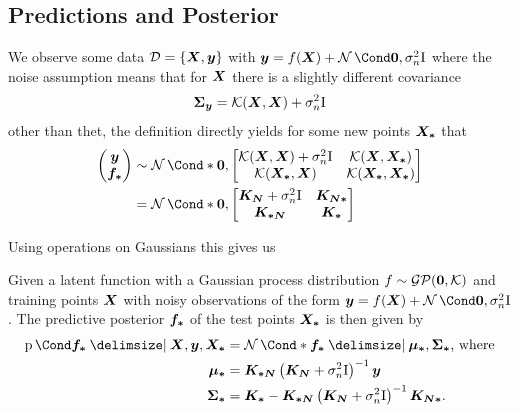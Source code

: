 \subsection{Predictions and Posterior}
We observe some data
$\mathcal{D} = \left\{ \bm{X}, \bm{y} \right\}$ with $\mat{y} = f(\mat{X}) + \Gaussian{\mat{0}, \sigma_n^2 \Eye}$
where the noise assumption means that for $\bm{X}$ there is a slightly different covariance
\begin{align}
    \bm{\Sigma_y} = \operatorname{\mathcal{K}}(\bm{X}, \bm{X}) + \sigma_n^2 \mathrm{I}
\end{align}
other than thet, the definition directly yields for some new points $\bm{X_\ast}$ that
\begin{align}
    \begin{pmatrix}
        \mat{y} \\
        \mat{f_\ast}
    \end{pmatrix} &\sim \Gaussian*{\mat{0}, \begin{bmatrix}
        \K(\mat{X}, \mat{X}) + \sigma_n^2 \Eye & \K(\mat{X}, \mat{X_\ast}) \\
        \K(\mat{X_\ast}, \mat{X}) & \K(\mat{X_\ast}, \mat{X_\ast})
    \end{bmatrix}} \\
    &= \Gaussian*{\mat{0}, \begin{bmatrix}
        \mat{K_N} + \sigma_n^2 \Eye & \mat{K_{N\ast}} \\
        \mat{K_{\ast N}} & \mat{K_{\ast}}
    \end{bmatrix}}
\end{align}

Using operations on Gaussians this gives us
\begin{lemma}
    Given a latent function with a Gaussian process distribution $f \sim \operatorname{\mathcal{GP}}(\bm{0}, \operatorname{\mathcal{K}})$ and training points $\bm{X}$ with noisy observations of the form $\mat{y} = f(\mat{X}) + \Gaussian{\mat{0}, \sigma_n^2 \Eye}$.
    The predictive posterior $\bm{f_\ast}$ of the test points $\bm{X_\ast}$ is then given by
    \begin{align}
        \Prob{\mat{f_\ast} \given \mat{X}, \mat{y}, \mat{X_\ast}} &= \Gaussian*{\mat{f_\ast} \given \mat{\mu_\ast}, \mat{\Sigma_\ast}} \text{, where} \\
        \mat{\mu_\ast} &= \mat{K_{\ast N}} \left( \mat{K_N} + \sigma_n^2 \Eye \right)^{-1} \mat{y} \\
        \mat{\Sigma_\ast} &= \mat{K_\ast} - \mat{K_{\ast N}} \left( \mat{K_N} + \sigma_n^2 \Eye \right)^{-1} \mat{K_{N\ast}}.
    \end{align}
\end{lemma}

